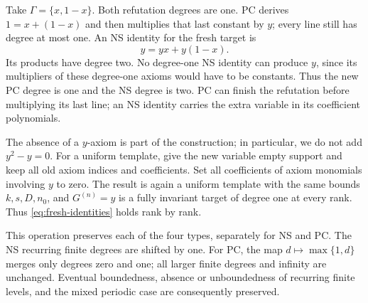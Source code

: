 \begin{example}
Take $\Gamma=\{x,1-x\}$. Both refutation degrees are one. PC derives
$1=x+(1-x)$ and then multiplies that last constant by $y$; every line
still has degree at most one. An NS identity for the fresh target is
\[
                             y=yx+y(1-x).
\]
Its products have degree two. No degree-one NS identity can produce
$y$, since its multipliers of these degree-one axioms would have to
be constants. Thus the new PC degree is one and the NS degree is two.
PC can finish the refutation before multiplying its last line; an NS
identity carries the extra variable in its coefficient polynomials.
\end{example}

The absence of a $y$-axiom is part of the construction; in particular,
we do not add $y^2-y=0$. For a uniform template, give the new variable
empty support and keep all old axiom indices and coefficients. Set
all coefficients of axiom monomials involving $y$ to zero. The result
is again a uniform template with the same bounds $k,s,D,n_0$, and
$G^{(n)}=y$ is a fully invariant target of degree one at every rank.
Thus \eqref{eq:fresh-identities} holds rank by rank.

This operation preserves each of the four types, separately for NS
and PC. The NS recurring finite degrees are shifted by one. For PC,
the map $d\mapsto\max\{1,d\}$ merges only degrees zero and one;
all larger finite degrees and infinity are unchanged. Eventual
boundedness, absence or unboundedness of recurring finite levels, and
the mixed periodic case are consequently preserved.

